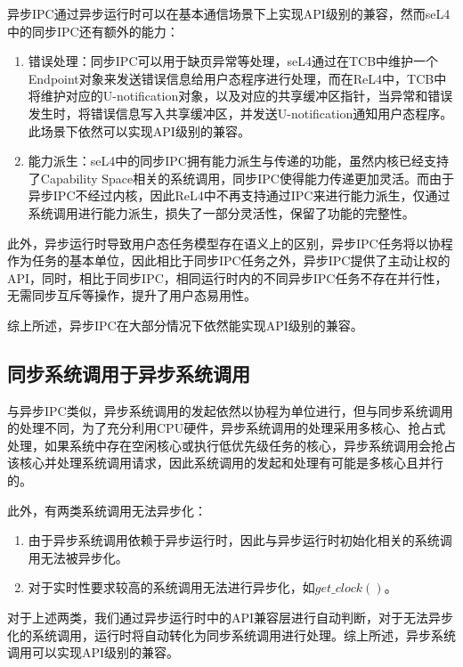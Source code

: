 异步IPC通过异步运行时可以在基本通信场景下上实现API级别的兼容，然而seL4中的同步IPC还有额外的能力：
\begin{enumerate}
  \item 	错误处理：同步IPC可以用于缺页异常等处理，seL4通过在TCB中维护一个Endpoint对象来发送错误信息给用户态程序进行处理，而在ReL4中，TCB中将维护对应的U-notification对象，以及对应的共享缓冲区指针，当异常和错误发生时，将错误信息写入共享缓冲区，并发送U-notification通知用户态程序。此场景下依然可以实现API级别的兼容。
  \item 能力派生：seL4中的同步IPC拥有能力派生与传递的功能，虽然内核已经支持了Capability Space相关的系统调用，同步IPC使得能力传递更加灵活。而由于异步IPC不经过内核，因此ReL4中不再支持通过IPC来进行能力派生，仅通过系统调用进行能力派生，损失了一部分灵活性，保留了功能的完整性。
\end{enumerate}

此外，异步运行时导致用户态任务模型存在语义上的区别，异步IPC任务将以协程作为任务的基本单位，因此相比于同步IPC任务之外，异步IPC提供了主动让权的API，同时，相比于同步IPC，相同运行时内的不同异步IPC任务不存在并行性，无需同步互斥等操作，提升了用户态易用性。

综上所述，异步IPC在大部分情况下依然能实现API级别的兼容。

\subsection{同步系统调用于异步系统调用}
与异步IPC类似，异步系统调用的发起依然以协程为单位进行，但与同步系统调用的处理不同，为了充分利用CPU硬件，异步系统调用的处理采用多核心、抢占式处理，如果系统中存在空闲核心或执行低优先级任务的核心，异步系统调用会抢占该核心并处理系统调用请求，因此系统调用的发起和处理有可能是多核心且并行的。

此外，有两类系统调用无法异步化：
\begin{enumerate}
  \item 由于异步系统调用依赖于异步运行时，因此与异步运行时初始化相关的系统调用无法被异步化。
  \item 对于实时性要求较高的系统调用无法进行异步化，如$get\_clock()$。
\end{enumerate}

对于上述两类，我们通过异步运行时中的API兼容层进行自动判断，对于无法异步化的系统调用，运行时将自动转化为同步系统调用进行处理。综上所述，异步系统调用可以实现API级别的兼容。

